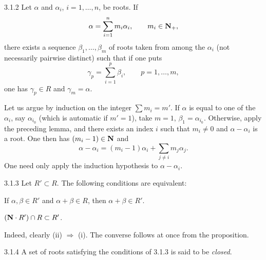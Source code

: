 \begin{proposition}{3.1.2}\label{XXI.3.1.2}
Let $\alpha$ and $\alpha_i$, $i=1,\ldots,n$, be roots. If
\[
\alpha=\sum_{i=1}^nm_i\alpha_i,\qquad m_i\in\mathbf{N}_+,
\]
there exists a sequence $\beta_1,\ldots,\beta_m$ of roots taken from among the $\alpha_i$ (not necessarily pairwise distinct) such that if one puts
\[
\gamma_p=\sum_{i=1}^p\beta_i,\qquad p=1,\ldots,m,
\]
one has $\gamma_p\in R$ and $\gamma_m=\alpha$.
\end{proposition}
Let us argue by induction on the integer $\sum m_i=m'$. If $\alpha$ is equal to one of the $\alpha_i$, say $\alpha_{i_0}$ (which is automatic if $m'=1$), take $m=1$, $\beta_1=\alpha_{i_0}$. Otherwise, apply the preceding lemma, and there exists an index $i$ such that $m_i\ne0$ and $\alpha-\alpha_i$ is a root. One then has $(m_i-1)\in\mathbf{N}$ and
\[
\alpha-\alpha_i=(m_i-1)\alpha_i+\sum_{j\ne i}m_j\alpha_j.
\]
One need only apply the induction hypothesis to $\alpha-\alpha_i$.

\begin{corollary}{3.1.3}\label{XXI.3.1.3}
Let $R'\subset R$. The following conditions are equivalent:
\begin{enumeratei}
\item If $\alpha,\beta\in R'$ and $\alpha+\beta\in R$, then $\alpha+\beta\in R'$.
\item $(\mathbf{N}\cdot R')\cap R\subset R'$.
\end{enumeratei}
\end{corollary}
Indeed, clearly (ii) $\Rightarrow$ (i). The converse follows at once from the proposition.
\begin{definition}{3.1.4}\label{XXI.3.1.4}
A set of roots satisfying the conditions of 3.1.3 is said to be \emph{closed}.
\end{definition}

